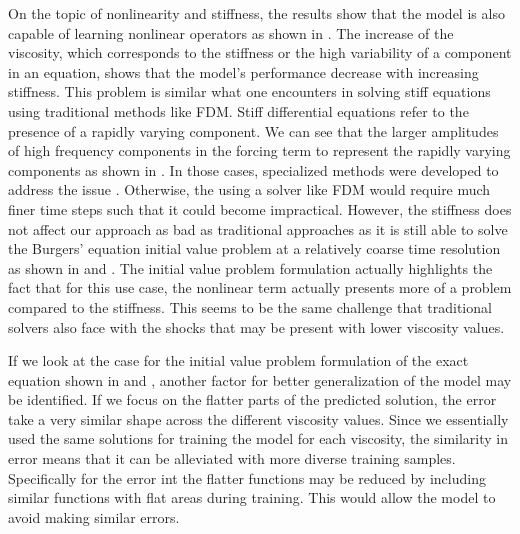 On the topic of nonlinearity and stiffness, the results show that the model is also capable of learning nonlinear operators as shown in . The increase of the viscosity, which corresponds to the stiffness or the high variability of a component in an equation, shows that the model's performance decrease with increasing stiffness. This problem is similar what one encounters in solving stiff equations using traditional methods like FDM\@. Stiff differential equations refer to the presence of a rapidly varying component. We can see that the larger amplitudes of high frequency components in the forcing term to represent the rapidly varying components as shown in . In those cases, specialized methods were developed to address the issue \autocite{kassamFourthOrderTimeSteppingStiff2005,seydaogluNumericalSolutionBurgers2016}. Otherwise, the using a solver like FDM would require much finer time steps such that it could become impractical. However, the stiffness does not affect our approach as bad as traditional approaches as it is still able to solve the Burgers' equation initial value problem at a relatively coarse time resolution as shown in  and . The initial value problem formulation actually highlights the fact that for this use case, the nonlinear term actually presents more of a problem compared to the stiffness. This seems to be the same challenge that traditional solvers also face with the shocks that may be present with lower viscosity values.

If we look at the case for the initial value problem formulation of the exact equation shown in  and , another factor for better generalization of the model may be identified. If we focus on the flatter parts of the predicted solution, the error take a very similar shape across the different viscosity values. Since we essentially used the same solutions for training the model for each viscosity, the similarity in error means that it can be alleviated with more diverse training samples. Specifically for the error int the flatter functions may be reduced by including similar functions with flat areas during training. This would allow the model to avoid making similar errors.

